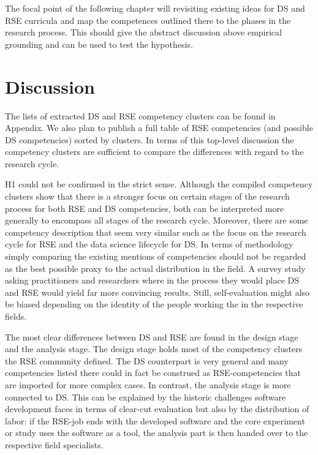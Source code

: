 \documentclass[
        english,biblatex
    ]{lni}
\begin{document}
    The focal point of the following chapter will revisiting existing
    ideas for DS and RSE curricula and map the competences outlined
    there to the phases in the research process. This should give the
    abstract discussion above empirical grounding and can be used to
    test the hypothesis.

    \section{Discussion}\label{discussion}

    The lists of extracted DS and RSE competency clusters can be found
    in Appendix. We also plan to publish a full table of RSE
    competencies (and possible DS competencies) sorted by clusters. In
    terms of this top-level discussion the competency clusters are
    sufficient to compare the differences with regard to the research
    cycle.

    H1 could not be confirmed in the strict sense. Although the compiled
    competency clusters show that there is a stronger focus on certain
    stages of the research process for both RSE and DS competencies,
    both can be interpreted more generally to encompass all stages of
    the research cycle. Moreover, there are some competency description
    that seem very similar such as the focus on the research cycle for
    RSE and the data science lifecycle for DS. In terms of methodology
    simply comparing the existing mentions of competencies should not be
    regarded as the best possible proxy to the actual distribution in
    the field. A survey study asking practitioners and researchers where
    in the process they would place DS and RSE would yield far more
    convincing results. Still, self-evaluation might also be biased
    depending on the identity of the people working the in the
    respective fields.

    The most clear differences between DS and RSE are found in the
    design stage and the analysis stage. The design stage holds most of
    the competency clusters the RSE community defined. The DS
    counterpart is very general and many competencies listed there could
    in fact be construed as RSE-competencies that are imported for more
    complex cases. In contrast, the analysis stage is more connected to
    DS. This can be explained by the historic challenges software
    development faces in terms of clear-cut evaluation but also by the
    distribution of labor: if the RSE-job ends with the developed
    software and the core experiment or study uses the software as a
    tool, the analysis part is then handed over to the respective field
    specialists.
\end{document}
